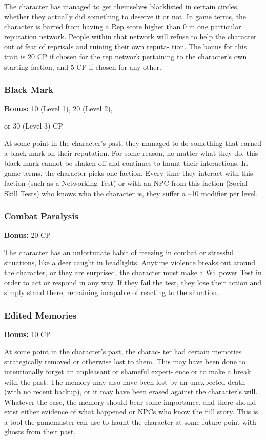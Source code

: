 The character has managed to get themselves 
blacklisted in certain circles, whether they actually 
did something to deserve it or not. In game terms, the 
character is barred from having a Rep score higher 
than 0 in one particular reputation network. People 
within that network will refuse to help the character 
out of fear of reprisals and ruining their own reputa-
tion. The bonus for this trait is 20 CP if chosen for the 
rep network pertaining to the character's own starting 
faction, and 5 CP if chosen for any other.

\subsubsection{Black Mark}

\textbf{Bonus:} 10 (Level 1), 20 (Level 2), 

or 30 (Level 3) CP

At some point in the character's past, they managed 
to do something that earned a black mark on their 
reputation. For some reason, no matter what they do, 
this black mark cannot be shaken off and continues to 
haunt their interactions. In game terms, the character 
picks one faction. Every time they interact with this 
faction (such as a Networking Test) or with an NPC 
from this faction (Social Skill Tests) who knows who 
the character is, they suffer a –10 modifier per level.

\subsubsection{Combat Paralysis}

\textbf{Bonus:} 20 CP

The character has an unfortunate habit of freezing 
in combat or stressful situations, like a deer caught in 
headlights. Anytime violence breaks out around the 
character, or they are surprised, the character must 
make a Willpower Test in order to act or respond in 
any way. If they fail the test, they lose their action and 
simply stand there, remaining incapable of reacting to 
the situation.

\subsubsection{Edited Memories}

\textbf{Bonus:} 10 CP

At some point in the character's past, the charac-
ter had certain memories strategically removed or 
otherwise lost to them. This may have been done to 
intentionally forget an unpleasant or shameful experi-
ence or to make a break with the past. The memory 
may also have been lost by an unexpected death (with 
no recent backup), or it may have been erased against 
the character's will. Whatever the case, the memory 
should bear some importance, and there should exist 
either evidence of what happened or NPCs who know 
the full story. This is a tool the gamemaster can use to 
haunt the character at some future point with ghosts 
from their past.

